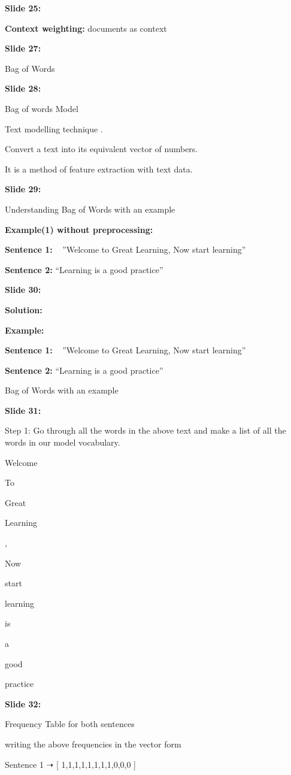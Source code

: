 \documentclass[11pt,a4paper]{article}
\begin{document}
\textbf{Slide 25:}

\textbf{Context weighting:}  documents as context

\textbf{Slide 27:}

Bag of Words

\textbf{Slide 28:}

Bag of words Model

Text modelling technique .

Convert a text into its equivalent vector of numbers.

It is a method of feature extraction with text data.

\textbf{Slide 29:}

Understanding Bag of Words with an example

\textbf{Example(1) without preprocessing:} 

\textbf{Sentence 1:}   ”Welcome to Great Learning, Now start learning”

\textbf{Sentence 2:}  “Learning is a good practice”

\textbf{Slide 30:}

\textbf{Solution:} 

\textbf{Example:} 

\textbf{Sentence 1:}   ”Welcome to Great Learning, Now start learning”​

\textbf{Sentence 2:}  “Learning is a good practice”

Bag of Words with an example

\textbf{Slide 31:}

Step 1: Go through all the words in the above text and make a list of all the words in our model vocabulary.

Welcome

To

Great

Learning

,

Now

start

learning

is

a

good

practice

\textbf{Slide 32:}

Frequency Table for both sentences

writing the above frequencies in the vector form

Sentence 1 ➝ [ 1,1,1,1,1,1,1,1,0,0,0 ]
\end{document}
